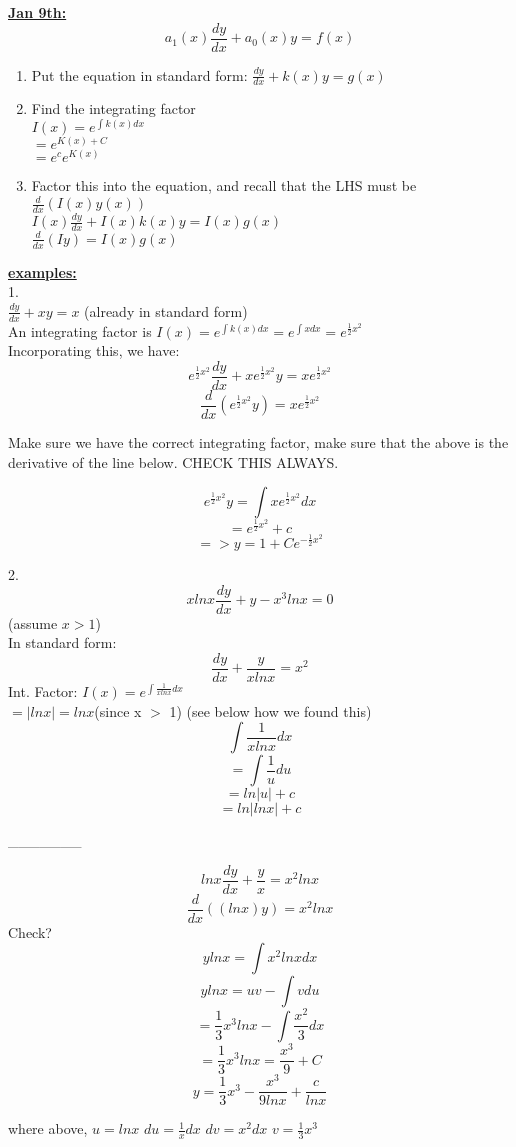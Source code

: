 \documentclass[12pt]{article}
\newcommand{\myt}[1]{\textbf{\underline{#1}}}
\begin{document}
	\myt{Jan 9th:}
	$$a_1(x)\frac{dy}{dx} + a_0(x)y = f(x)$$
	
	\begin{enumerate}
		\item Put the equation in standard form: $\frac{dy}{dx} + k(x)y = g(x)$
		\item Find the integrating factor \\
		$I(x) = e^{\int k(x)dx}$\\
		$= e^{K(x) + C}$\\
		$= e^ce^{K(x)}$\\
		\item Factor this into the equation, and recall that the LHS must be $\frac{d}{dx}(I(x)y(x))$\\
		$I(x)\frac{dy}{dx} + I(x)k(x)y = I(x)g(x)$\\
		$\frac{d}{dx}(Iy) = I(x)g(x)$
	\end{enumerate}

	\myt{examples:}\\
	1.\\
	$\frac{dy}{dx} + xy = x$ (already in standard form)\\
	An integrating factor is $I(x) = e^{\int k(x)dx} = e^{\int xdx} = e^{\frac{1}{2}x^2}$\\
	
	Incorporating this, we have:\\
	$$e^{\frac{1}{2}x^2}\frac{dy}{dx} + xe^{\frac{1}{2}x^2}y = xe^{\frac{1}{2}x^2}$$
	$$\frac{d}{dx}(e^{\frac{1}{2}x^2}y) = xe^{\frac{1}{2}x^2}$$
	
	Make sure we have the correct integrating factor, make sure that the above is the derivative of the line below. CHECK THIS ALWAYS.
	
	$$e^{\frac{1}{2}x^2}y = \int xe^{\frac{1}{2}x^2}dx$$
	$$= e^{\frac{1}{2}x^2} + c$$
	$$=> y = 1 + Ce^{-\frac{1}{2}x^2}$$
	
	2.\\
	
	$$xlnx\frac{dy}{dx} + y - x^3lnx = 0$$
	(assume $x > 1$)\\
	In standard form:\\
	$$\frac{dy}{dx} + \frac{y}{xlnx} = x^2$$
	Int. Factor: $I(x) = e^{\int \frac{1}{xlnx}dx}$\\
	$= |lnx| = lnx $(since x $>$ 1) (see below how we found this)\\
	$$\int \frac{1}{xlnx}dx$$
	$$= \int \frac{1}{u} du$$
	$$= ln|u| + c$$
	$$= ln|lnx| + c$$
	
	\_\_\_\_\_\_\_
	
	$$lnx\frac{dy}{dx} + \frac{y}{x} = x^2lnx$$
	$$\frac{d}{dx}((lnx)y) = x^2lnx$$
	Check?
	$$ylnx = \int x^2lnxdx$$
	$$ylnx = uv - \int vdu$$
	$$= \frac{1}{3}x^3lnx - \int \frac{x^2}{3}dx$$
	$$= \frac{1}{3}x^3lnx = \frac{x^3}{9} + C$$
	$$y = \frac{1}{3}x^3 - \frac{x^3}{9lnx} + \frac{c}{lnx}$$
	
	where above, $u = lnx$ $du = \frac{1}{x}dx$ $dv = x^2dx$ $v = \frac{1}{3}x^3$\\
	
	
\end{document}
